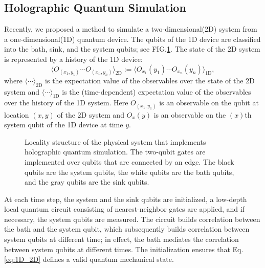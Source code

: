 \documentclass[prx,aps,amsmath,amssymb,floatfix,superscriptaddress,11pt,tightenlines,longbibliography,onecolumn,notitlepage]{revtex4-1}
\begin{document}
\subsection{Holographic Quantum Simulation\label{section:HQS}}
Recently, we proposed a method to simulate a two-dimensional(2D) system from a one-dimensional(1D) quantum device. The qubits of the 1D device are classified into the bath, sink, and the system qubits; see FIG.\ref{fig:architecture}. The state of the 2D system is represented by a history of the 1D device:
\begin{equation}
  \langle O_{(x_1,y_1)}\cdots O_{(x_n,y_n)}\rangle_{\text{2D}} := \langle O_{x_1}(y_1) \cdots O_{x_n}(y_n)\rangle_{\text{1D}}, \label{eq:1D_2D}
\end{equation}
where $\langle \cdots \rangle_{\text{2D}}$ is the expectation value of the observables over the state of the 2D system and $\langle \cdots \rangle_{\text{1D}}$ is the (time-dependent) expectation value of the observables over the history of the 1D system. Here $O_{(x_1,y_1)}$ is an observable on the qubit at location $(x,y)$ of the 2D system and $O_x(y)$ is an observable on the $(x)$th system qubit of the 1D device at time $y$.
\begin{figure}[h]
  \caption{Locality structure of the physical system that implements holographic quantum simulation. The two-qubit gates are implemented over qubits that are connected by an edge. The black qubits are the system qubits, the white qubits are the bath qubits, and the gray qubits are the sink qubits. \label{fig:architecture}}
\end{figure}

At each time step, the system and the sink qubits are initialized, a low-depth local quantum circuit consisting of nearest-neighbor gates are applied, and if necessary, the system qubits are measured. The circuit builds correlation between the bath and the system qubit, which subsequently builds correlation between system qubits at different time; in effect, the bath mediates the correlation between system qubits at different times. The initialization ensures that Eq.\ref{eq:1D_2D} defines a valid quantum mechanical state.
\end{document}
